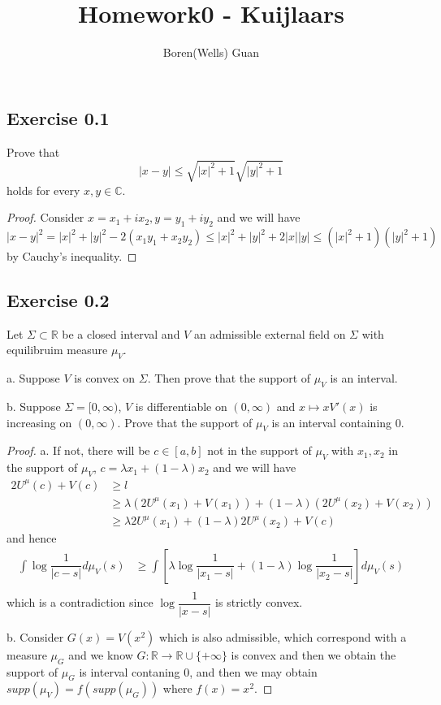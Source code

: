 \documentclass[lang=en,11pt,a4paper,citestyle =authoryear]{elegantpaper}
\title{Homework0 - Kuijlaars}
\author{Boren(Wells) Guan}
\newcommand{\R}{\mathbb{R}}
\newcommand{\C}{\mathbb{C}}
\begin{document}
\maketitle

\subsection*{Exercise 0.1} Prove that
\[|x-y| \leq \sqrt{|x|^2+1}\sqrt{|y|^2+1}\]
holds for every $x,y \in \C$.
\begin{proof}
Consider $x= x_1 + ix_2, y = y_1+iy_2$ and we will have
\[
|x-y|^2 = |x|^2 + |y|^2 - 2(x_1y_1+x_2 y_2) \leq |x|^2 + |y|^2 + 2|x||y| \leq (|x|^2+1)(|y|^2+1)
\]
by Cauchy's inequality.
\end{proof}

\subsection*{Exercise 0.2} Let $\Sigma \subset \R$ be a closed interval and $V$ an admissible external field on $\Sigma$ with equilibruim measure $\mu_V$.\par
a. Suppose $V$ is convex on $\Sigma$. Then prove that the support of $\mu_V$ is an interval.\par
b. Suppose $\Sigma = [0,\infty)$, $V$ is differentiable on $(0,\infty)$ and $x\mapsto xV'(x)$ is increasing on $(0,\infty)$. Prove that the support of $\mu_V$ is an interval containing $0$.
\begin{proof}
    a. If not, there will be $c\in [a,b]$ not in the support of $\mu_V$ with $x_1,x_2$ in the support of $\mu_V$, $c= \lambda x_1 + (1-\lambda)x_2$ and we will have
    \[
    \begin{aligned}
    2U^{\mu}(c) + V(c) &\geq l \\ &\geq \lambda (2U^{\mu}(x_1)+V(x_1))+(1-\lambda)(2U^{\mu}(x_2)+V(x_2)) \\ &\geq \lambda 2U^{\mu}(x_1) + (1-\lambda)2U^{\mu}(x_2) + V(c)
    \end{aligned}
    \]
    and hence
    \[
    \begin{aligned}
    \int \log \dfrac{1}{|c-s|}d\mu_V(s) &\geq \int [\lambda \log \dfrac{1}{|x_1-s|} + (1-\lambda)\log \dfrac{1}{|x_2-s|}] d\mu_V(s) \\
    \end{aligned}
    \]
    which is a contradiction since $\log \dfrac{1}{|x-s|}$ is strictly convex.\par
    b. Consider $G(x) = V(x^2)$ which is also admissible, which correspond with a measure $\mu_G$ and we know $G:\R\to \R\cup\{+\infty\}$ is convex and then we obtain the support of $\mu_G$ is interval contaning $0$, and then we may obtain $supp(\mu_V) = f(supp(\mu_G))$ where $f(x) = x^2$. 
\end{proof}
\end{document}

